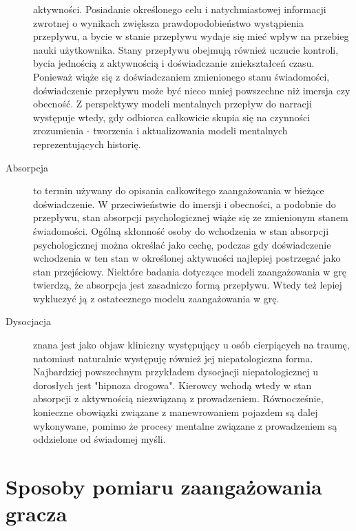 \begin{description}
            aktywności\cite{development_of_game}. Posiadanie określonego celu i natychmiastowej informacji zwrotnej o wynikach zwiększa
            prawdopodobieństwo wystąpienia przepływu, a bycie w stanie przepływu wydaje się mieć wpływ na przebieg nauki
            użytkownika. Stany przepływu obejmują również uczucie kontroli, bycia jednością z aktywnością i doświadczanie
            zniekształceń czasu. Ponieważ wiąże się z doświadczaniem zmienionego stanu świadomości, doświadczenie
            przepływu może być nieco mniej powszechne niż imersja czy obecność\cite{development_of_game}. Z perspektywy modeli mentalnych
            przepływ do narracji występuje wtedy, gdy odbiorca całkowicie skupia się na czynności zrozumienia -
            tworzenia i aktualizowania modeli mentalnych reprezentujących historię\cite{measuring_narrative}.
      \item[Absorpcja] to termin używany do opisania całkowitego zaangażowania w bieżące doświadczenie. W
            przeciwieństwie do imersji i obecności, a podobnie do przepływu, stan absorpcji psychologicznej
            wiąże się ze zmienionym stanem świadomości\cite{development_of_game}. Ogólną skłonność osoby do wchodzenia
            w stan absorpcji psychologicznej można określać jako cechę, podczas gdy doświadczenie
            wchodzenia w ten stan w określonej aktywności najlepiej postrzegać jako stan przejściowy\cite{development_of_game}.
            Niektóre badania dotyczące modeli zaangażowania w grę twierdzą, że absorpcja jest zasadniczo formą
            przepływu. Wtedy też lepiej wykluczyć ją z ostatecznego modelu zaangażowania w grę\cite{eng_in_games}.
      \item[Dysocjacja] znana jest jako objaw kliniczny występujący u osób cierpiących na traumę, natomiast
            naturalnie występuję również jej niepatologiczna forma\cite{development_of_game}.
            Najbardziej powszechnym przykładem dysocjacji niepatologicznej u dorosłych jest "hipnoza drogowa".
            Kierowcy wchodą wtedy w stan absorpcji z aktywnością niezwiązaną z prowadzeniem.
            Równocześnie, konieczne obowiązki związane z manewrowaniem
            pojazdem są dalej wykonywane, pomimo że procesy mentalne związane z prowadzeniem są oddzielone
            od świadomej myśli\cite{development_of_game}.
\end{description}

\section{Sposoby pomiaru zaangażowania gracza}\label{section:ch5_2}

